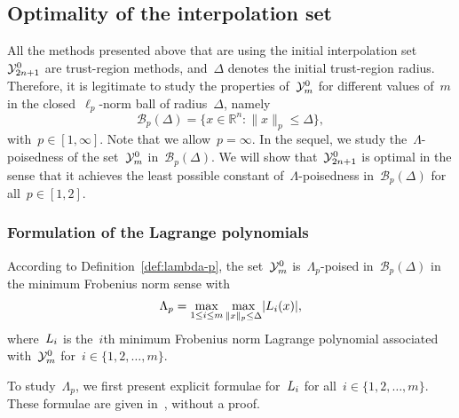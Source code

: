 \documentclass[draft]{article}
\numberwithin{equation}{section}
\theoremstyle{definition}
\theoremstyle{plain}
\newcommand{\abs}[2][]{#1\lvert#2#1\rvert}
\newcommand{\lagp}[1][]{L\ifblank{#1}{}{_{#1}}}
\newcommand{\norm}[2][]{#1\lVert#2#1\rVert}
\newcommand{\R}{\mathbb{R}}
\newcommand{\set}[2][]{#1\{#2#1\}}
\newcommand{\xpt}[1][]{\mathcal{Y}\ifblank{#1}{}{^{#1}}}
\begin{document}
\subsection{Optimality of the interpolation set}

All the methods presented above that are using the initial interpolation set~$\xpt[0]_{2n + 1}$ are trust-region methods, and~$\Delta$ denotes the initial trust-region radius.
Therefore, it is legitimate to study the properties of~$\xpt[0]_m$ for different values of~$m$ in the closed~$\ell_p$-norm ball of radius~$\Delta$, namely
\begin{equation*}
    \mathcal{B}_p(\Delta) = \set{x \in \R^n : \norm{x}_p \le \Delta},
\end{equation*}
with~$p \in [1, \infty]$.
Note that we allow~$p = \infty$.
In the sequel, we study the~$\Lambda$-poisedness of the set~$\xpt[0]_m$ in~$\mathcal{B}_p(\Delta)$.
We will show that~$\xpt[0]_{2n + 1}$ is optimal in the sense that it achieves the least possible constant of~$\Lambda$-poisedness in~$\mathcal{B}_p(\Delta)$ for all~$p \in [1, 2]$.

\subsubsection{Formulation of the Lagrange polynomials}

According to Definition~\ref{def:lambda-p}, the set~$\xpt[0]_m$ is~$\Lambda_p$-poised in~$\mathcal{B}_p(\Delta)$ in the minimum Frobenius norm sense with
\begin{equation*}
    \Lambda_p = \max_{1 \le i \le m} \max_{\norm{x}_p \le \Delta} \abs{\lagp[i](x)},
\end{equation*}
where~$\lagp[i]$ is the~$i$th minimum Frobenius norm Lagrange polynomial associated with~$\xpt[0]_m$ for~$i \in \set{1, 2, \dots, m}$.

To study~$\Lambda_p$, we first present explicit formulae for~$\lagp[i]$ for all~$i \in \set{1, 2, \dots, m}$.
These formulae are given in~\cite[\S~3]{Powell_2006}, without a proof.
\end{document}
